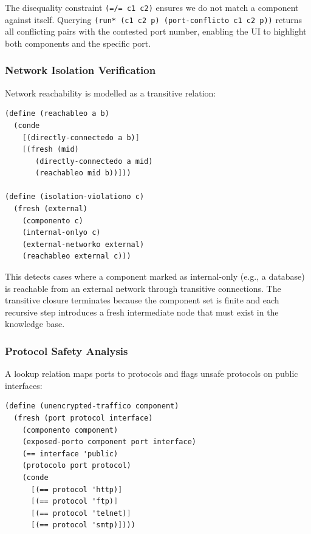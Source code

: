 \documentclass[11pt,twocolumn]{article}
\begin{document}
The disequality constraint \texttt{(=/= c1 c2)} ensures we do not
match a component against itself. Querying \texttt{(run* (c1 c2 p)
(port-conflicto c1 c2 p))} returns all conflicting pairs with the
contested port number, enabling the UI to highlight both components
and the specific port.

\subsubsection{Network Isolation Verification}
\label{sec:rule-network}

Network reachability is modelled as a transitive relation:

\begin{lstlisting}[language=Scheme,caption={Network reachability as a
transitive closure.},label=lst:network-reach]
(define (reachableo a b)
  (conde
    [(directly-connectedo a b)]
    [(fresh (mid)
       (directly-connectedo a mid)
       (reachableo mid b))]))

(define (isolation-violationo c)
  (fresh (external)
    (componento c)
    (internal-onlyo c)
    (external-networko external)
    (reachableo external c)))
\end{lstlisting}

This detects cases where a component marked as internal-only (e.g., a
database) is reachable from an external network through transitive
connections. The transitive closure terminates because the component
set is finite and each recursive step introduces a fresh intermediate
node that must exist in the knowledge base.

\subsubsection{Protocol Safety Analysis}
\label{sec:rule-protocol}

A lookup relation maps ports to protocols and flags unsafe protocols
on public interfaces:

\begin{lstlisting}[language=Scheme,caption={Protocol safety relation.},
label=lst:protocol-rule]
(define (unencrypted-traffico component)
  (fresh (port protocol interface)
    (componento component)
    (exposed-porto component port interface)
    (== interface 'public)
    (protocolo port protocol)
    (conde
      [(== protocol 'http)]
      [(== protocol 'ftp)]
      [(== protocol 'telnet)]
      [(== protocol 'smtp)])))
\end{lstlisting}
\end{document}
